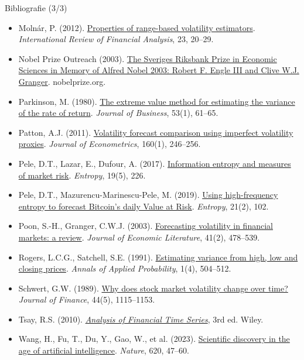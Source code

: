 \begin{frame}{Bibliografie (3/3)}
\itemsize{\tiny}
\begin{itemize}
    \item Molnár, P. (2012). \href{https://doi.org/10.1016/j.irfa.2011.06.012}{Properties of range-based volatility estimators}. \textit{International Review of Financial Analysis}, 23, 20--29.
    \item Nobel Prize Outreach (2003). \href{https://www.nobelprize.org/prizes/economic-sciences/2003/summary/}{The Sveriges Riksbank Prize in Economic Sciences in Memory of Alfred Nobel 2003: Robert F. Engle III and Clive W.J. Granger}. nobelprize.org.
    \item Parkinson, M. (1980). \href{https://doi.org/10.1086/296071}{The extreme value method for estimating the variance of the rate of return}. \textit{Journal of Business}, 53(1), 61--65.
    \item Patton, A.J. (2011). \href{https://doi.org/10.1016/j.jeconom.2010.03.034}{Volatility forecast comparison using imperfect volatility proxies}. \textit{Journal of Econometrics}, 160(1), 246--256.
    \item Pele, D.T., Lazar, E., Dufour, A. (2017). \href{https://doi.org/10.3390/e19050226}{Information entropy and measures of market risk}. \textit{Entropy}, 19(5), 226.
    \item Pele, D.T., Mazurencu-Marinescu-Pele, M. (2019). \href{https://doi.org/10.3390/e21020102}{Using high-frequency entropy to forecast Bitcoin's daily Value at Risk}. \textit{Entropy}, 21(2), 102.
    \item Poon, S.-H., Granger, C.W.J. (2003). \href{https://doi.org/10.1257/002205103765762743}{Forecasting volatility in financial markets: a review}. \textit{Journal of Economic Literature}, 41(2), 478--539.
    \item Rogers, L.C.G., Satchell, S.E. (1991). \href{https://doi.org/10.1214/aoap/1177005835}{Estimating variance from high, low and closing prices}. \textit{Annals of Applied Probability}, 1(4), 504--512.
    \item Schwert, G.W. (1989). \href{https://doi.org/10.1111/j.1540-6261.1989.tb02647.x}{Why does stock market volatility change over time?} \textit{Journal of Finance}, 44(5), 1115--1153.
    \item Tsay, R.S. (2010). \href{https://doi.org/10.1002/9780470644560}{\textit{Analysis of Financial Time Series}}, 3rd ed. Wiley.
    \item Wang, H., Fu, T., Du, Y., Gao, W., et al. (2023). \href{https://doi.org/10.1038/s41586-023-06221-2}{Scientific discovery in the age of artificial intelligence}. \textit{Nature}, 620, 47--60.

\end{itemize}
\end{frame}
